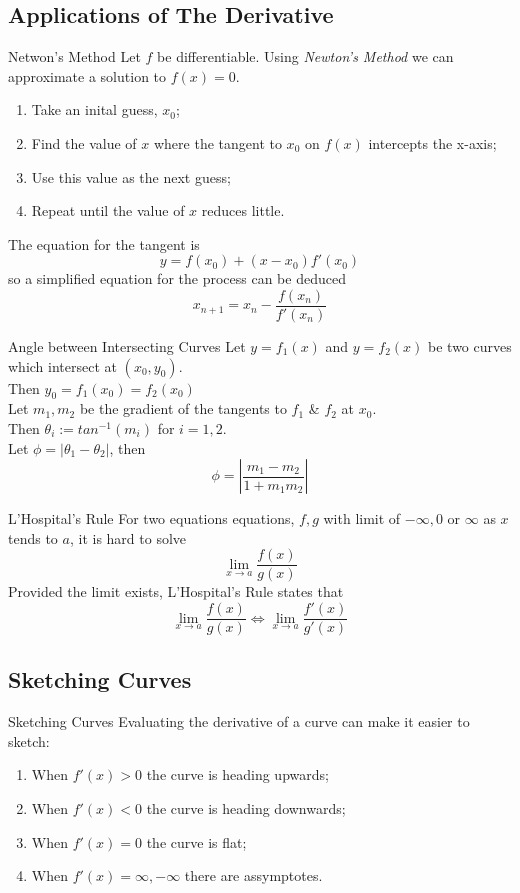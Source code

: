\documentclass[11pt,a4paper]{article}
\begin{document}
\newpage
\subsection{Applications of The Derivative}
%
\subtitle{Thoerem 3.09 - }{Netwon's Method}
Let $f$ be differentiable. Using \textit{Newton's Method} we can approximate a solution to $f(x) = 0$.
\begin{enumerate}[label=\roman*)]
  \item Take an inital guess, $x_0$;
  \item Find the value of $x$ where the tangent to $x_0$ on $f(x)$ intercepts the x-axis;
  \item Use this value as the next guess;
  \item Repeat until the value of $x$ reduces little.
\end{enumerate}
The equation for the tangent is $$y = f(x_0) + (x - x_0)f'(x_0)$$ so a simplified equation for the process can be deduced $$x_{n+1} = x_n - \frac{f(x_n)}{f'(x_n)}$$

\subtitle{Theorem 3.10 - }{Angle between Intersecting Curves}
Let $y = f_1(x)$ and $y = f_2(x)$ be two curves which intersect at $(x_0, y_0)$. \\
Then $y_0 = f_1(x_0) = f_2(x_0)$ \\
Let $m_1, m_2$ be the gradient of the tangents to $f_1$ \& $f_2$ at $x_0$. \\
Then $\theta_i := tan^{-1}(m_i)$ for $i = 1, 2$. \\
Let $\phi = |\theta_1 - \theta_2|$, then $$\phi = \left|\frac{m_1 - m_2}{1 + m_1m_2}\right|$$

\subtitle{Theorem 3.11 - }{L'Hospital's Rule}
For two equations equations, $f,g$ with limit of $-\infty, 0$ or $\infty$ as $x$ tends to $a$, it is hard to solve $$\lim_{x \to a}\frac{f(x)}{g(x)}$$
Provided the limit exists, L'Hospital's Rule states that $$\lim_{x \to a}\frac{f(x)}{g(x)} \iff \lim_{x \to a}\frac{f'(x)}{g'(x)}$$

\subsection{Sketching Curves}
%
\subtitle{Remark 3.11 - }{Sketching Curves}
Evaluating the derivative of a curve can make it easier to sketch:
\begin{enumerate}[label=\roman*)]
  \item When $f'(x) > 0$ the curve is heading upwards;
  \item When $f'(x) < 0$ the curve is heading downwards;
  \item When $f'(x) = 0$ the curve is flat;
  \item When $f'(x) = \infty, -\infty$ there are assymptotes.
\end{enumerate}
\end{document}
